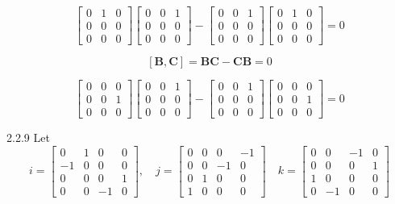 \documentclass{article}
\begin{document}
\begin{flushleft}
$$\begin{bmatrix}{0} & {1} & {0} \\ {0} & {0} & {0} \\ {0} & {0} & {0}\end{bmatrix} \begin{bmatrix}{0} & {0} & {1} \\ {0} & {0} & {0} \\ {0} & {0} & {0}\end{bmatrix}- \begin{bmatrix}{0} & {0} & {1} \\ {0} & {0} & {0} \\ {0} & {0} & {0}\end{bmatrix}\begin{bmatrix}{0} & {1} & {0} \\ {0} & {0} & {0} \\ {0} & {0} & {0}\end{bmatrix} = 0$$

$$[\mathbf{B}, \mathbf{C}] = \mathbf{BC}-\mathbf{C}\mathbf{B} = 0$$

$$\begin{bmatrix}{0} & {0} & {0} \\ {0} & {0} & {1} \\ {0} & {0} & {0}\end{bmatrix}\begin{bmatrix}{0} & {0} & {1} \\ {0} & {0} & {0} \\ {0} & {0} & {0}\end{bmatrix}- \begin{bmatrix}{0} & {0} & {1} \\ {0} & {0} & {0} \\ {0} & {0} & {0}\end{bmatrix}\begin{bmatrix}{0} & {0} & {0} \\ {0} & {0} & {1} \\ {0} & {0} & {0}\end{bmatrix} = 0 $$

\begin{mybox}{2.2.9}
Let
$$
i=\begin{bmatrix}{0} & {1} & {0} & {0} \\ {-1} & {0} & {0} & {0} \\ {0} & {0} & {0} & {1} \\ {0} & {0} & {-1} & {0}\end{bmatrix}, \quad j=\begin{bmatrix}{0} & {0} & {0} & {-1} \\ {0} & {0} & {-1} & {0} \\ {0} & {1} & {0} & {0} \\ {1} & {0} & {0} & {0}\end{bmatrix} \quad k=\begin{bmatrix}{0} & {0} & {-1} & {0} \\ {0} & {0} & {0} & {1} \\ {1} & {0} & {0} & {0} \\ {0} & {-1} & {0} & {0}\end{bmatrix}
$$


\end{mybox}
\end{flushleft}
\end{document}
